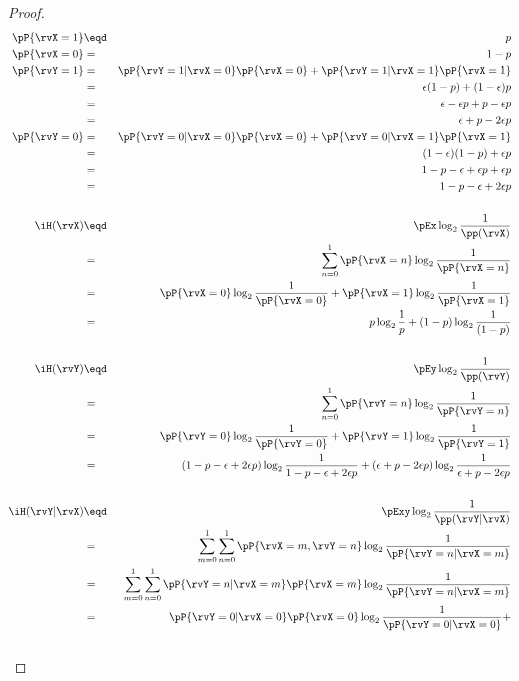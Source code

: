 \begin{proof}
\begin{eqnarray*}
  \pP{\rvX=1} &\eqd& p    \\
  \pP{\rvX=0} &=& 1-p     \\
  \pP{\rvY=1}
    &=& \pP{\rvY=1|\rvX=0}\pP{\rvX=0} + \pP{\rvY=1|\rvX=1}\pP{\rvX=1}
  \\&=& \epsilon(1-p) + (1-\epsilon)p
  \\&=& \epsilon-\epsilon p + p-\epsilon p
  \\&=& \epsilon+p-2\epsilon p
\\
  \pP{\rvY=0} 
    &=& \pP{\rvY=0|\rvX=0}\pP{\rvX=0} + \pP{\rvY=0|\rvX=1}\pP{\rvX=1}
  \\&=& (1-\epsilon )(1-p) + \epsilon p
  \\&=& 1-p-\epsilon +\epsilon p+\epsilon p
  \\&=& 1-p-\epsilon +2\epsilon p
\\
\\
  \iH(\rvX)
    &\eqd& \pEx \log_2 \frac{1}{\pp(\rvX)}
  \\&=&    \sum_{n=0}^1 \pP{\rvX=n} \log_2 \frac{1}{\pP{\rvX=n}}
  \\&=&    \pP{\rvX=0} \log_2 \frac{1}{\pP{\rvX=0}} +
           \pP{\rvX=1} \log_2 \frac{1}{\pP{\rvX=1}}
  \\&=&    p     \log_2 \frac{1}{p} +
           (1-p) \log_2 \frac{1}{(1-p)}
\\
\\
  \iH(\rvY)
    &\eqd& \pEy \log_2 \frac{1}{\pp(\rvY)}
  \\&=&    \sum_{n=0}^1 \pP{\rvY=n} \log_2 \frac{1}{\pP{\rvY=n}}
  \\&=&    \pP{\rvY=0} \log_2 \frac{1}{\pP{\rvY=0}} + 
           \pP{\rvY=1} \log_2 \frac{1}{\pP{\rvY=1}}
  \\&=&    (1-p-\epsilon +2\epsilon p) \log_2 \frac{1}{1-p-\epsilon +2\epsilon p} + 
           (\epsilon +p-2\epsilon p)   \log_2 \frac{1}{\epsilon +p-2\epsilon p}
\\
\\
  \iH(\rvY|\rvX)
    &\eqd& \pExy \log_2 \frac{1}{\pp(\rvY|\rvX)}
  \\&=&    \sum_{m=0}^1\sum_{n=0}^1 \pP{\rvX=m,\rvY=n} \log_2 \frac{1}{\pP{\rvY=n|\rvX=m}}
  \\&=&    \sum_{m=0}^1\sum_{n=0}^1 \pP{\rvY=n|\rvX=m}\pP{\rvX=m} 
           \log_2 \frac{1}{\pP{\rvY=n|\rvX=m}}
  \\&=&    \pP{\rvY=0|\rvX=0}\pP{\rvX=0} \log_2 \frac{1}{\pP{\rvY=0|\rvX=0}} + \\&&

\end{eqnarray*}
\end{proof}
